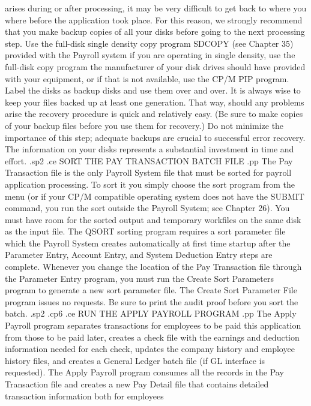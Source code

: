 arises during or after processing, it may be very difficult to get back
to where you where before the application took place.  For this reason,
we strongly recommend that you make backup copies of all your disks before
going to the next processing step. Use the full-disk single density copy
program SDCOPY (see Chapter 35) provided with the
Payroll system if you are operating in
single density, use the full-disk copy program the manufacturer of your disk
drives should have provided with your equipment, or if that is not available,
use the CP/M PIP program.
Label the disks as backup disks and use them over and over.
It is always wise to keep your files backed up at least
one generation.
That way, should any problems arise the recovery procedure is quick
and relatively easy. (Be sure to make copies of your
backup files before you use them for
recovery.)  Do not minimize the importance of this step; adequate backups
are crucial to successful error recovery.  The information on your disks
represents a substantial investment in time and effort.
.sp2
.ce
SORT THE PAY TRANSACTION BATCH FILE
.pp
The Pay Transaction file is the only Payroll System file that must
be sorted for payroll application
processing.  To sort it you simply choose
the sort program from the menu (or if your CP/M compatible operating system
does not have the SUBMIT command, you run the sort outside the Payroll
System; see Chapter 26).
You must have room for the sorted output and temporary workfiles
on the same disk as the input file.  The QSORT sorting program requires
a sort parameter file which the Payroll System creates
automatically at first time startup
after the Parameter Entry, Account Entry, and System Deduction Entry steps
are complete.  Whenever you change the
location of the Pay Transaction file through the Parameter Entry program,
you must run
the Create Sort Parameters program to generate a new sort parameter file.
The Create Sort Parameter File program issues no requests.  Be sure to print
the audit proof before you sort the batch.
.sp2
.cp6
.ce
RUN THE APPLY PAYROLL PROGRAM
.pp
The Apply Payroll program
separates transactions for employees to be paid this application from
those to be paid later, creates a check file with the
earnings and deduction
information needed for each check, updates the company history and
employee history files, and creates a General Ledger
batch file (if GL interface
is requested).	The Apply Payroll program consumes all the
records in the Pay Transaction file and creates a new Pay Detail file that
contains detailed transaction information both for employees
